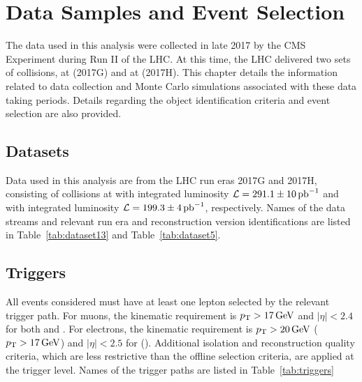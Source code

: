 \chapter{Data Samples and Event Selection}\label{ch:data}
The data used in this analysis were collected in late 2017 by the CMS Experiment during Run II of the LHC. At this time, the LHC delivered two sets of \pp collisions, at \serag (2017G) and at \serah (2017H). This chapter details the information related to data collection and Monte Carlo simulations associated with these data taking periods. Details regarding the object identification criteria and event selection are also provided.



\section{Datasets}\label{ch:data:dataset}
Data used in this analysis are from the LHC run eras 2017G and 2017H, consisting of \pp collisions at \serag with integrated luminosity $\mathcal{L}=291.1\pm 10 \,\mathrm{pb}^{-1}$ and \serah with integrated luminosity $\mathcal{L}=199.3\pm 4 \,\mathrm{pb}^{-1}$, respectively. Names of the data streams and relevant run era and reconstruction version identifications are listed in Table~\ref{tab:dataset13} and Table~\ref{tab:dataset5}. 


\section{Triggers}\label{ch:data:triggers}
All events considered must have at least one lepton selected by the relevant trigger path. For muons, the kinematic requirement is $p_{\mathrm{T}}>17\,\text{Ge\hspace{-.08em}V}$ and $|\eta|<2.4$ for both \serag and \serah. For electrons, the kinematic requirement is $p_{\mathrm{T}}>20\,\text{Ge\hspace{-.08em}V}$ ($p_{\mathrm{T}}>17\,\text{Ge\hspace{-.08em}V}$) and $|\eta|<2.5$ for \serag (\serah). Additional isolation and reconstruction quality criteria, which are less restrictive than the offline selection criteria, are applied at the trigger level. Names of the trigger paths are listed in  Table~\ref{tab:triggers}




